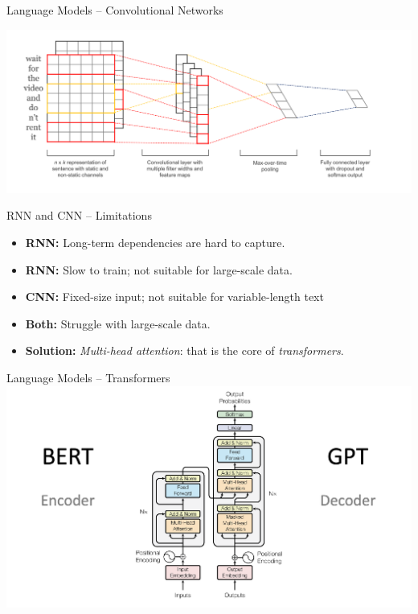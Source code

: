 \documentclass[presentation, 10pt]{beamer}\mode<presentation>{\usetheme{AMSBolognaFC}}
\begin{document}
\begin{frame}{Language Models -- Convolutional Networks}

\includegraphics[width=\textwidth]{img/cnn-text.png}

\end{frame}

\begin{frame}{RNN and CNN -- Limitations}
\begin{itemize}
	\item \textbf{RNN:} Long-term dependencies are hard to capture.
	\item \textbf{RNN:} Slow to train; not suitable for large-scale data.
	\item \textbf{CNN:} Fixed-size input; not suitable for variable-length text
	\item \textbf{Both:} Struggle with large-scale data.
	\item \textbf{Solution:} \emph{Multi-head attention}: that is the core of \emph{transformers}.
\end{itemize}
\end{frame}
\begin{frame}{Language Models -- Transformers~\cite{DBLP:conf/nips/VaswaniSPUJGKP17}}
\includegraphics[width=\textwidth]{img/transformers.png}
\end{frame}
\end{document}
